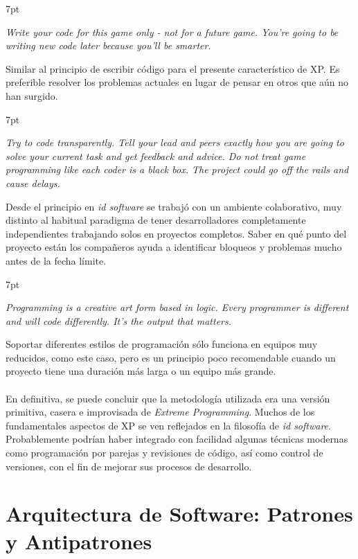 \documentclass[a4paper,12pt]{report}
\newenvironment{formal}{%
	\def\FrameCommand{%
		\hspace{1pt}%
		{\color{darkblue}\vrule width 2pt}%
		{\color{formalshade}\vrule width 4pt}%
		\colorbox{formalshade}%
	}%
	\MakeFramed{\advance\hsize-\width\FrameRestore}%
	\noindent\hspace{-4.55pt}%
	\begin{adjustwidth}{}{7pt}%
		\vspace{2pt}\vspace{2pt}%
	}
	{%
		\vspace{2pt}\end{adjustwidth}\endMakeFramed%
}
\begin{document}
	\begin{formal}
		\textit{Write your code for this game only - not for a future game. You're going to be writing new code later because you'll be smarter.}        
	\end{formal}
	Similar al principio de escribir código para el presente característico de XP. Es preferible resolver los problemas actuales en lugar de pensar en otros que aún no han surgido.
	
	\begin{formal}
		\textit{Try to code transparently. Tell your lead and peers exactly how you are going to solve your current task and get feedback and advice. Do not treat game programming like each coder is a black box. The project could go off the rails and cause delays.}        
	\end{formal}
	Desde el principio en \textit{id software} se trabajó con un ambiente colaborativo, muy distinto al habitual paradigma de tener desarrolladores completamente independientes trabajando solos en proyectos completos. Saber en qué punto del proyecto están los compañeros ayuda a identificar bloqueos y problemas mucho antes de la fecha límite.\\
	
	\begin{formal}
		\textit{Programming is a creative art form based in logic. Every programmer is different and will code differently. It's the output that matters.}
	\end{formal}
	Soportar diferentes estilos de programación sólo funciona en equipos muy reducidos, como este caso, pero es un principio poco recomendable cuando un proyecto tiene una duración más larga o un equipo más grande. \\
	\\
	En definitiva, se puede concluir que la metodología utilizada era una versión primitiva, casera e improvisada de \textit{Extreme Programming}. Muchos de los fundamentales aspectos de XP se ven reflejados en la filosofía de \textit{id software}. Probablemente podrían haber integrado con facilidad algunas técnicas modernas como programación por parejas y revisiones de código, así como control de versiones, con el fin de mejorar sus procesos de desarrollo.
	
	
	\section{Arquitectura de Software: Patrones y Antipatrones}
\end{document}
